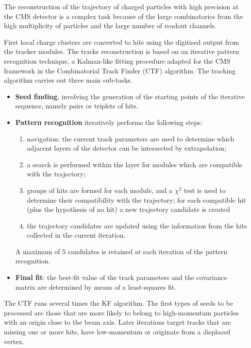 The reconstruction of the trajectory of charged particles with high precision at the CMS detector
is a complex task because of the large combinatorics from the high multiplicity of particles and the large number of readout channels.

First local charge clusters are converted to hits using the digitised output from the tracker modules.
The tracks reconstruction is based on an iterative pattern recognition technique,
a Kalman-like fitting procedure adapted for the CMS framework in the Combinatorial Track Finder \cite{billoir.qian:simultaneous, Speer:2005dp} (CTF) algorithm.
The tracking algorithm carries out three main sub-tasks.
\begin{itemize}
\item \textbf{Seed finding}, involving the generation of the starting points of the iterative sequence, namely pairs or triplets of hits.
\item \textbf{Pattern recognition} iteratively performs the following steps:
  \begin{enumerate}
  \item navigation: the current track parameters are used to determine which adjacent layers of the detector can be intersected by extrapolation;
  \item a search is performed within the layer for modules which are compatible with the trajectory;
  \item groups of hits are formed for each module, and a $\chi^2$ test is used to determine their compatibility with the trajectory;
    for each compatible hit (plus the hypothesis of no hit) a new trajectory candidate is created
  \item the trajectory candidates are updated using the information from the hits collected in the current iteration.
  \end{enumerate}
  A maximum of 5 candidates is retained at each iteration of the pattern recognition.
\item \textbf{Final fit}: the best-fit value of the track parameters and the covariance matrix are determined by means of a least-squares fit.
\end{itemize}
The CTF runs several times the KF algorithm.
The first types of seeds to be processed are those that are more likely to belong to high-momentum particles with an origin close to the beam axis.
Later iterations target tracks that are missing one or more hits, have low-momentum or originate from a displaced vertex.

